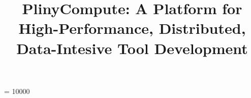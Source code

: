 \documentclass[11pt]{article}
\begin{document}
\widowpenalty = 10000

\title{PlinyCompute: A Platform for High-Performance, Distributed, Data-Intesive Tool Development}

\maketitle

























%
%

%
%
\end{document}
